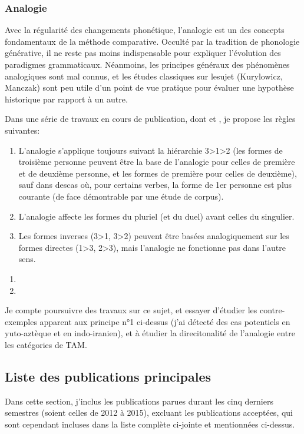 \documentclass[oldfontcommands,oneside,a4paper,11pt]{article}
\begin{document}
\subsubsection{Analogie}
Avec la régularité des changements phonétique, l'analogie est un des concepts fondamentaux de la méthode comparative. Occulté par la tradition de phonologie générative, il ne reste pas moins indispensable pour expliquer l'évolution des paradigmes grammaticaux. Néanmoins, les principes généraux des phénomènes analogiques sont mal connus, et les études classiques sur lesujet (Kurylowicz, Manczak) sont peu utile d'un point de vue pratique pour évaluer une hypothèse historique par rapport à un autre. 

Dans une série de travaux en cours de publication, dont \citet{jacques15directionality} et \citet{jacques16ebde}, je propose les règles suivantes:

\begin{enumerate}
\item L'analogie s'applique toujours suivant la hiérarchie 3>1>2 (les formes de troisième personne peuvent être la base de l'analogie pour celles de première et de deuxième personne, et les formes de première pour celles de deuxième), sauf dans descas où, pour certains verbes, la forme de 1er personne est plus courante (de face démontrable par une étude de corpus).
\item L'analogie affecte les formes du pluriel (et du duel) avant celles du singulier.
\item Les formes inverses (3>1, 3>2) peuvent être basées analogiquement sur les formes directes (1>3, 2>3), mais l'analogie ne fonctionne pas dans l'autre sens.
\end{enumerate}

\begin{enumerate}
 \item  {}
 \item {}
\end{enumerate}

Je compte poursuivre des travaux sur ce sujet, et essayer d'étudier les contre-exemples apparent aux principe n°1 ci-dessus (j'ai détecté des cas potentiels en yuto-aztèque et en indo-iranien), et à étudier la direcitonalité de l'analogie entre les catégories de TAM.

\subsection{Liste des publications principales}
Dans cette section, j'inclus les publications parues durant les cinq derniers semestres (soient celles de 2012 à 2015), excluant les publications acceptées, qui sont cependant incluses dans la liste complète ci-jointe et mentionnées ci-dessus.
%
\end{document}
